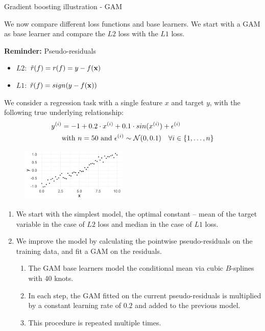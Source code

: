 \begin{vbframe}{Gradient boosting illustration - GAM}

We now compare different loss functions and base learners.
We start with a GAM as base learner and compare the $L2$ loss with
the $L1$ loss.\\
\vspace*{0.1cm}

\textbf{Reminder:} Pseudo-residuals
\begin{itemize}
\item $L2$: $\tilde{r}(f) = r(f) = y - f(\mathbf{x})$
\item $L1$: $\tilde{r}(f) = sign(y - f(\mathbf{x}))$
\end{itemize}
We consider a regression task with a single feature $x$ and target $y$, with
the following true underlying relationship:
\vspace{-0.2cm}
\begin{align*}
y^{(i)} &=  -1 + 0.2 \cdot x^{(i)} + 0.1 \cdot sin(x^{(i)}) + \epsilon^{(i)} \\
&\text{with } n = 50 \text{ and } \epsilon^{(i)} \sim \mathcal{N}(0, 0.1) \quad
\forall i \in \{1, \ldots, n\}
\end{align*}

\vfill

\begin{figure}
  \includegraphics[width = 0.45\textwidth]{figure/illustration_data_normal.png}
\end{figure}

\framebreak


\begin{enumerate}
  \item We start with the simplest model, the optimal constant -- mean of the
  target variable in the case of $L2$ loss and median in the case of $L1$ loss.
  \item We improve the model by calculating the pointwise
  pseudo-residuals on the training data, and fit a GAM on the residuals.
  \begin{enumerate}
    \item The GAM base learners model the conditional mean via cubic $B$-splines
    with 40 knots.
    \item In each step, the GAM fitted on the current pseudo-residuals is
    multiplied by a constant learning rate of $0.2$ and added to the previous
    model.
    \item This procedure is repeated multiple times.
  \end{enumerate}
\end{enumerate}

\end{vbframe}

